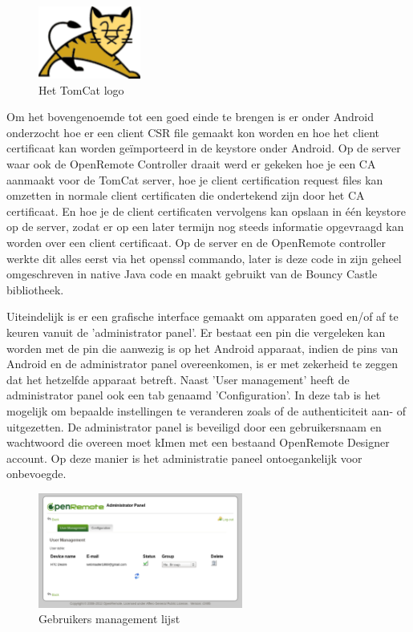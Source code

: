 \documentclass[]{article}
\begin{document}
\begin{figure}
  \begin{center}
    \includegraphics[width=0.30\textwidth]{tomcat.pdf}
  \end{center}
  \caption{Het TomCat logo}
\end{figure}

Om het bovengenoemde tot een goed einde te brengen is er onder Android
onderzocht hoe er een client CSR file gemaakt kon worden en hoe het client
certificaat kan worden geïmporteerd in de keystore onder Android. Op de
server waar ook de OpenRemote Controller draait werd er gekeken hoe je een
CA aanmaakt voor de TomCat server, hoe je client certification request
files kan omzetten in normale client certificaten die ondertekend zijn door
het CA certificaat. En hoe je de client certificaten vervolgens kan opslaan
in één keystore op de server, zodat er op een later termijn nog steeds
informatie opgevraagd kan worden over een client certificaat. Op de server
en de OpenRemote controller werkte dit alles eerst via het openssl
commando, later is deze code in zijn geheel omgeschreven in native Java
code en maakt gebruikt van de Bouncy Castle bibliotheek.

Uiteindelijk is er een grafische interface gemaakt om apparaten goed en/of
af te keuren vanuit de 'administrator panel'. Er bestaat een pin die
vergeleken kan worden met de pin die aanwezig is op het Android apparaat,
indien de pins van Android en de administrator panel overeenkomen, is er
met zekerheid te zeggen dat het hetzelfde apparaat betreft. Naast 'User
management' heeft de administrator panel ook een tab genaamd
'Configuration'. In deze tab is het mogelijk om bepaalde instellingen te
veranderen zoals of de authenticiteit aan- of uitgezetten. De administrator
panel is beveiligd door een gebruikersnaam en wachtwoord die overeen moet
kImen met een bestaand OpenRemote Designer account. Op deze manier is het
administratie paneel ontoegankelijk voor onbevoegde.

\begin{figure}[htpb]
   \begin{center}
     \includegraphics[width=0.6\textwidth]{userlist.pdf}
   \end{center}
   \caption{Gebruikers management lijst}
\end{figure}
\end{document}
